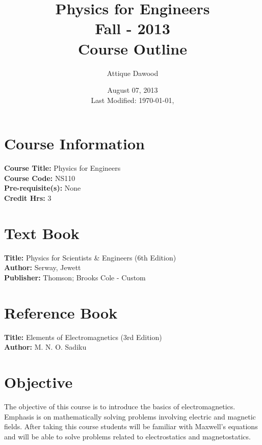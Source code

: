 \documentclass[12pt,a4paper]{article}
\title{\vspace{-3.5cm}Physics for Engineers\\Fall - 2013\\Course Outline}
\author{Attique Dawood}
\date{August 07, 2013\\[0.2cm] Last Modified: \today, \currenttime}
\begin{document}
\maketitle
\section{Course Information}
\noindent\textbf{Course Title:} Physics for Engineers\\
\textbf{Course Code:} NS110\\
\textbf{Pre-requisite(s):} None\\
\textbf{Credit Hrs:} 3\\
\section{Text Book}
\textbf{Title:} Physics for Scientists \& Engineers  (6th Edition)\\
\textbf{Author:} Serway, Jewett\\
\textbf{Publisher:} Thomson; Brooks Cole - Custom\\
\section{Reference Book}
\textbf{Title:} Elements of Electromagnetics (3rd Edition)\\
\textbf{Author:} M. N. O. Sadiku\\
\section{Objective}
The objective of this course is to introduce the basics of electromagnetics. Emphasis is on mathematically solving problems involving electric and magnetic fields. After taking this course students will be familiar with Maxwell’s equations and will be able to solve problems related to electrostatics and magnetostatics.
\end{document}
